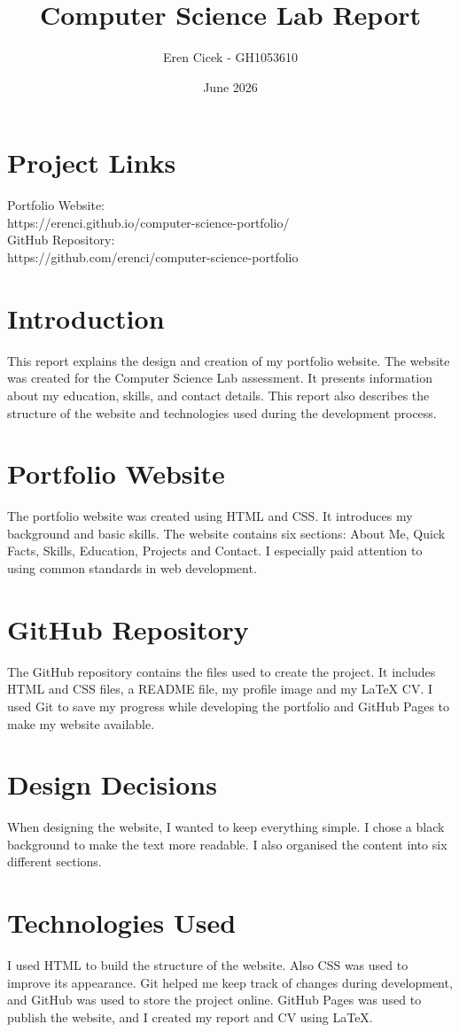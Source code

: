 \documentclass{article}
\title{Computer Science Lab Report}
\author{Eren Cicek - GH1053610}
\date{June 2026}
\begin{document}
\maketitle

\section{Project Links}
Portfolio Website:\\
https://erenci.github.io/computer-science-portfolio/\\
GitHub Repository:\\
https://github.com/erenci/computer-science-portfolio


\section{Introduction}
This report explains the design and creation of my portfolio website.
The website was created for the Computer Science Lab assessment. It presents information about my education, skills, and contact details. This report also describes the structure of the website and technologies used during the development process.
\section{Portfolio Website}
The portfolio website was created using HTML and CSS. It introduces my background and basic skills. The website contains six sections: About Me, Quick Facts, Skills, Education, Projects and Contact. I especially paid attention to using common standards in web development.
\section{GitHub Repository}
The GitHub repository contains the files used to create the project. It includes HTML and CSS files, a README file, my profile image and my LaTeX CV. I used Git to save my progress while developing the portfolio  and GitHub Pages to make my website available.  
\section{Design Decisions}
When designing the website, I wanted to keep everything simple. I chose a black background to make the text more readable. I also organised the content into six different sections. 
\section{Technologies Used}
I used HTML to build the structure of the website. Also CSS was used to improve its appearance. Git helped me keep track of changes during development, and GitHub was used to store the project online. GitHub Pages was used to publish the website, and I created my report and CV using LaTeX.
\end{document}
